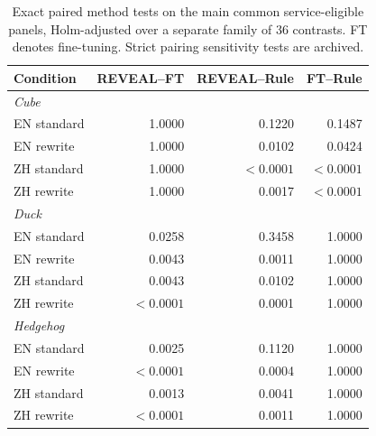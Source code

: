 \begin{table}[t]
\centering\footnotesize
\setlength{\tabcolsep}{5pt}
\begin{tabular}{@{}lrrr@{}}
\toprule
Condition & REVEAL--FT & REVEAL--Rule & FT--Rule\\
\midrule
\multicolumn{4}{l}{\textit{Cube}}\\
EN standard & 1.0000 & 0.1220 & 0.1487\\
EN rewrite & 1.0000 & 0.0102 & 0.0424\\
ZH standard & 1.0000 & $<0.0001$ & $<0.0001$\\
ZH rewrite & 1.0000 & 0.0017 & $<0.0001$\\
\midrule
\multicolumn{4}{l}{\textit{Duck}}\\
EN standard & 0.0258 & 0.3458 & 1.0000\\
EN rewrite & 0.0043 & 0.0011 & 1.0000\\
ZH standard & 0.0043 & 0.0102 & 1.0000\\
ZH rewrite & $<0.0001$ & 0.0001 & 1.0000\\
\midrule
\multicolumn{4}{l}{\textit{Hedgehog}}\\
EN standard & 0.0025 & 0.1120 & 1.0000\\
EN rewrite & $<0.0001$ & 0.0004 & 1.0000\\
ZH standard & 0.0013 & 0.0041 & 1.0000\\
ZH rewrite & $<0.0001$ & 0.0011 & 1.0000\\
\bottomrule
\end{tabular}
\caption{Exact paired method tests on the main common service-eligible panels, Holm-adjusted over a separate family of 36 contrasts. FT denotes fine-tuning. Strict pairing sensitivity tests are archived.}
\label{tab:language-method-tests}
\end{table}
